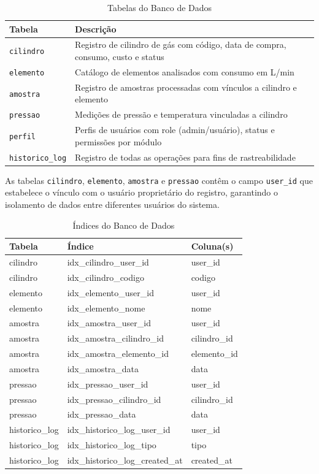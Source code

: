 \documentclass[12pt,a4paper]{article}
\providecommand\关键字[1]{\textbf{#1}}
\begin{document}
\begin{table}[h!]
\centering
\caption{Tabelas do Banco de Dados}
\label{tab:bancos}
\begin{tabular}{@{}ll@{}}
\toprule
\textbf{Tabela} & \textbf{Descrição} \\
\midrule
\texttt{cilindro} & Registro de cilindro de gás com código, data de compra, consumo, custo e status \\
\texttt{elemento} & Catálogo de elementos analisados com consumo em L/min \\
\texttt{amostra} & Registro de amostras processadas com vínculos a cilindro e elemento \\
\texttt{pressao} & Medições de pressão e temperatura vinculadas a cilindro \\
\texttt{perfil} & Perfis de usuários com role (admin/usuário), status e permissões por módulo \\
\texttt{historico\_log} & Registro de todas as operações para fins de rastreabilidade \\
\bottomrule
\end{tabular}
\end{table}

As tabelas \texttt{cilindro}, \texttt{elemento}, \texttt{amostra} e \texttt{pressao} contêm o campo \texttt{user\_id} que estabelece o vínculo com o usuário proprietário do registro, garantindo o isolamento de dados entre diferentes usuários do sistema.


\begin{table}[h!]
\centering
\caption{Índices do Banco de Dados}
\label{tab:indices}
\begin{tabular}{@{}lll@{}}
\toprule
\textbf{Tabela} & \textbf{Índice} & \textbf{Coluna(s)} \\
\midrule
cilindro & idx\_cilindro\_user\_id & user_id \\
cilindro & idx\_cilindro\_codigo & codigo \\
elemento & idx\_elemento\_user\_id & user_id \\
elemento & idx\_elemento\_nome & nome \\
amostra & idx\_amostra\_user\_id & user_id \\
amostra & idx\_amostra\_cilindro\_id & cilindro_id \\
amostra & idx\_amostra\_elemento\_id & elemento_id \\
amostra & idx\_amostra\_data & data \\
pressao & idx\_pressao\_user\_id & user_id \\
pressao & idx\_pressao\_cilindro\_id & cilindro_id \\
pressao & idx\_pressao\_data & data \\
historico\_log & idx\_historico\_log\_user\_id & user_id \\
historico\_log & idx\_historico\_log\_tipo & tipo \\
historico\_log & idx\_historico\_log\_created\_at & created\_at \\
\bottomrule
\end{tabular}
\end{table}
\end{document}
